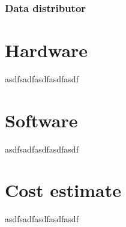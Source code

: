 \documentclass[../thesis.tex]{subfiles}
\begin{document}
\subsubsection{Data distributor}




\newpage
\section{Hardware}

asdfsadfasdfasdfasdf

\section{Software}

asdfsadfasdfasdfasdf

\section{Cost estimate}

asdfsadfasdfasdfasdf
\end{document}
